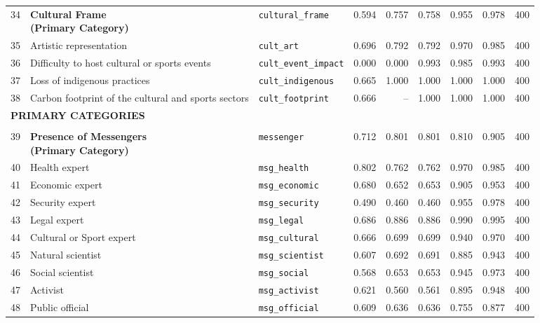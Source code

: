 \begin{longtable}{p{0.5cm}p{4.4cm}p{3.0cm}rrrrrr}
\midrule
\rowcolor{gray!8}
\multicolumn{9}{l}{\textit{Cultural Frame}} \\
\midrule
34 & \textbf{Cultural Frame\newline (Primary Category)} & \texttt{cultural\_frame} & 0.594 & 0.757 & 0.758 & 0.955 & 0.978 & 400 \\
\cmidrule(lr){1-9}
35 & Artistic representation & \texttt{cult\_art} & 0.696 & 0.792 & 0.792 & 0.970 & 0.985 & 400 \\
36 & Difficulty to host cultural or sports events & \texttt{cult\_event\_impact} & 0.000 & 0.000 & 0.993 & 0.985 & 0.993 & 400 \\
37 & Loss of indigenous practices & \texttt{cult\_indigenous} & 0.665 & 1.000 & 1.000 & 1.000 & 1.000 & 400 \\
38 & Carbon footprint of the cultural and sports sectors & \texttt{cult\_footprint} & 0.666 & -- & 1.000 & 1.000 & 1.000 & 400 \\
\midrule
\multicolumn{9}{l}{\cellcolor{gray!10}\textbf{PRIMARY CATEGORIES}} \\
\midrule
\rowcolor{gray!8}
\multicolumn{9}{l}{\textit{Actors/Messengers}} \\
\midrule
39 & \textbf{Presence of Messengers\newline (Primary Category)} & \texttt{messenger} & 0.712 & 0.801 & 0.801 & 0.810 & 0.905 & 400 \\
\cmidrule(lr){1-9}
40 & Health expert & \texttt{msg\_health} & 0.802 & 0.762 & 0.762 & 0.970 & 0.985 & 400 \\
41 & Economic expert & \texttt{msg\_economic} & 0.680 & 0.652 & 0.653 & 0.905 & 0.953 & 400 \\
42 & Security expert & \texttt{msg\_security} & 0.490 & 0.460 & 0.460 & 0.955 & 0.978 & 400 \\
43 & Legal expert & \texttt{msg\_legal} & 0.686 & 0.886 & 0.886 & 0.990 & 0.995 & 400 \\
44 & Cultural or Sport expert & \texttt{msg\_cultural} & 0.666 & 0.699 & 0.699 & 0.940 & 0.970 & 400 \\
45 & Natural scientist & \texttt{msg\_scientist} & 0.607 & 0.692 & 0.691 & 0.885 & 0.943 & 400 \\
46 & Social scientist & \texttt{msg\_social} & 0.568 & 0.653 & 0.653 & 0.945 & 0.973 & 400 \\
47 & Activist & \texttt{msg\_activist} & 0.621 & 0.560 & 0.561 & 0.895 & 0.948 & 400 \\
48 & Public official & \texttt{msg\_official} & 0.609 & 0.636 & 0.636 & 0.755 & 0.877 & 400 \\

\end{longtable}
